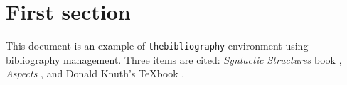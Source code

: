 \documentclass{article}
\begin{document}
\section{First section}

This document is an example of \texttt{thebibliography} environment using 
 bibliography management. Three items are cited: \emph{Syntactic Structures} 
book \cite{Chomsky1957}, \emph{Aspects} \cite{Chomsky1965}, and  
Donald Knuth's \TeX book \cite{Knuth1984texbook}.



\end{document}
